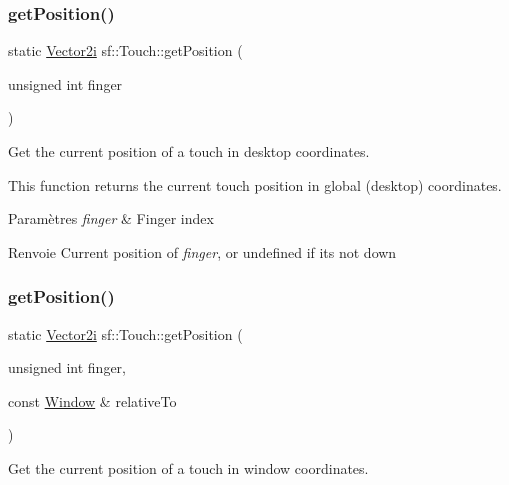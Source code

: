 \subsubsection{\texorpdfstring{get\+Position()}{getPosition()}\hspace{0.1cm}{\footnotesize\ttfamily [1/2]}}
{\footnotesize\ttfamily static \hyperlink{classsf_1_1Vector2}{Vector2i} sf\+::\+Touch\+::get\+Position (\begin{DoxyParamCaption}\item[{unsigned int}]{finger }\end{DoxyParamCaption})\hspace{0.3cm}{\ttfamily [static]}}



Get the current position of a touch in desktop coordinates. 

This function returns the current touch position in global (desktop) coordinates.


\begin{DoxyParams}{Paramètres}
{\em finger} & Finger index\\
\hline
\end{DoxyParams}
\begin{DoxyReturn}{Renvoie}
Current position of {\itshape finger}, or undefined if it\textquotesingle{}s not down 
\end{DoxyReturn}
\mbox{\label{classsf_1_1Touch_a372acaba3c7ac70fca4614c16ac4a1bb}} 
\subsubsection{\texorpdfstring{get\+Position()}{getPosition()}\hspace{0.1cm}{\footnotesize\ttfamily [2/2]}}
{\footnotesize\ttfamily static \hyperlink{classsf_1_1Vector2}{Vector2i} sf\+::\+Touch\+::get\+Position (\begin{DoxyParamCaption}\item[{unsigned int}]{finger,  }\item[{const \hyperlink{classsf_1_1Window}{Window} \&}]{relative\+To }\end{DoxyParamCaption})\hspace{0.3cm}{\ttfamily [static]}}



Get the current position of a touch in window coordinates. 

